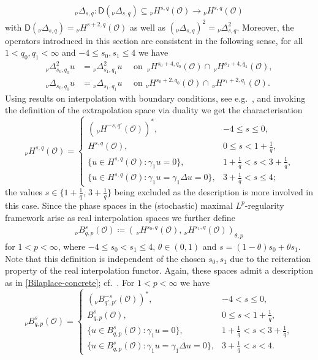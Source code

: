 \documentclass[reqno]{amsart}
\newcommand{\sO}{\mathscr{O}}
\newcommand{\seq}{\subseteq}
\newcommand{\1}{\mathbf{1}}
\newcommand{\nH}{\ensuremath{\,_\nu H}}
\newcommand{\bpsn}[1]{\ensuremath{\nH^{#1}(\sO)}}
\begin{document}
\begin{align*}
     _\nu\Delta_{s,q}:\mathsf{D}(_\nu\Delta_{s,q})\seq { _\nu H^{ s, q}(\sO)}\to{ _\nu H^{ s, q}(\sO)} 
\end{align*}
with $\mathsf{D}({_\nu \Delta_{s,q}})={_\nu H^{s+2, q}(\sO)}$ as well as $(_\nu\Delta_{s,q})^2={_\nu\Delta_{s,q}^2}$.
Moreover, the operators introduced in this section are consistent in the following sense, for all $1<q_0,q_1<\infty$ and $-4\leq s_0,s_1 \leq 4$ we have
\begin{align}
    {}_\nu\Delta_{s_0,q_0}^2 u &= {}_\nu\Delta_{s_1,q_1}^2 u \quad  \text{ on  } \nH^{s_0+4, q_0}(\sO)\cap \nH^{ s_1+4, q_1}(\sO), \\
    _\nu\Delta_{s_0,q_0} u &= {}_\nu\Delta_{s_1,q_1} u \quad  \text{ on  } _\nu H^{s_0+2, q_0}(\sO)\cap \nH^{s_1+2, q_1}(\sO).
\end{align}
Using results on interpolation with boundary conditions, see e.g.~\cite{Seeley1972,roodenburgComplexInterpolationPowerweighted2026}, and invoking the definition of the extrapolation space via duality we get the characterisation
\begin{equation}\label{Bilaplace-concrete}
\bpsn{s,q}=
\begin{cases}
(\bpsn{-s,q'})^\ast, & -4 \leq s\leq  0,\\
H^{s,q}(\sO), & 0\le s<1+\frac{1}{q},\\[2pt]
\{u\in H^{s,q}(\sO):\gamma_1 u=0\}, & 1+\frac{1}{q}<s<3+\frac{1}{q},\\[2pt]
\{u\in H^{s,q}(\sO):\gamma_1 u=\gamma_1\Delta u=0\}, & 3+\frac{1}{q}<s\leq 4;
\end{cases}
\end{equation}
the values $s\in\{1+\frac{1}{q},\,3+\frac{1}{q}\}$ being excluded as the description is more involved in this case.
Since the phase spaces in the (stochastic) maximal $L^p$-regularity framework arise as real interpolation spaces we further define
\begin{align*}
 {_\nu B^{ s}_{q,p}(\sO)}  \coloneq \left(\bpsn{s_0,q},\,_\nu H^{s_1, q}(\sO)\right)_{\theta,p}
\end{align*} 
for $1< p< \infty$, where $-4 \leq s_0<s_1 \leq 4$, $\theta\in (0,1)$ and $s=(1-\theta)s_0+\theta s_1$.
Note that this definition is independent of the chosen $s_0,s_1$ due to the reiteration property of the real interpolation functor. Again, these spaces admit a description as in \eqref{Bilaplace-concrete}; cf.~\cite{Guidetti1991}. For $1< p<\infty$
we have
\begin{equation}
{_\nu B^{ s}_{q,p}(\sO)}=
\begin{cases}
( {_\nu B^{ -s}_{q',p'}(\sO)})^\ast, & -4 < s\leq  0,\\
{ B^{ s }_{q,p}(\sO)}, & 0\le s<1+\frac{1}{q},\\[2pt]
\{u\in { B^{ s }_{q,p}(\sO)}:\gamma_1 u=0\}, & 1+\frac{1}{q}<s<3+\frac{1}{q},\\[2pt]
\{u\in { B^{ s }_{q,p}(\sO)}:\gamma_1 u=\gamma_1\Delta u=0\}, & 3+\frac{1}{q}<s< 4.
\end{cases}
\end{equation}
\end{document}
